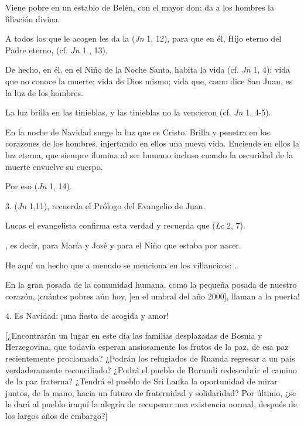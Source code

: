 \begin{body}
\begin{body}
		Viene pobre en un establo de Belén, con el mayor don: da a los hombres la filiación divina.
		
		A todos los que le acogen les da la  (\emph{Jn} 1, 12), para que en él, Hijo eterno del Padre eterno,  (cf. \emph{Jn} 1 , 13).
		
		De hecho, en él, en el Niño de la Noche Santa, habita la vida (cf. \emph{Jn} 1, 4): vida que no conoce la muerte; vida de Dios mismo; vida que, como dice San Juan, es la luz de los hombres.
		
		La luz brilla en las tinieblas, y las tinieblas no la vencieron (cf. \emph{Jn} 1, 4-5).
		
		En la noche de Navidad surge la luz que es Cristo. Brilla y penetra en los corazones de los hombres, injertando en ellos una nueva vida. Enciende en ellos la luz eterna, que siempre ilumina al ser humano incluso cuando la oscuridad de la muerte envuelve su cuerpo.
		
		Por eso  (\emph{Jn} 1, 14).
		
		3.  (\emph{Jn} 1,11), recuerda el Prólogo del Evangelio de Juan.
		
		Lucas el evangelista confirma esta verdad y recuerda que  (\emph{Lc} 2, 7).
		
		, es decir, para María y José y para el Niño que estaba por nacer.
		
		He aquí un hecho que a menudo se menciona en los villancicos: .
		
		En la gran posada de la comunidad humana, como la pequeña posada de nuestro corazón, ¡cuántos pobres aún hoy, {[}en el umbral del año 2000{]}, llaman a la puerta!
		
		4. Es Navidad: ¡una fiesta de acogida y amor!
		
		{[}¿Encontrarán un lugar en este día las familias desplazadas de Bosnia y Herzegovina, que todavía esperan ansiosamente los frutos de la paz, de esa paz recientemente proclamada? ¿Podrán los refugiados de Ruanda regresar a un país verdaderamente reconciliado? ¿Podrá el pueblo de Burundi redescubrir el camino de la paz fraterna? ¿Tendrá el pueblo de Sri Lanka la oportunidad de mirar juntos, de la mano, hacia un futuro de fraternidad y solidaridad? Por último, ¿se le dará al pueblo iraquí la alegría de recuperar una existencia normal, después de los largos años de embargo?{]}
		

\end{body}
\end{body}

